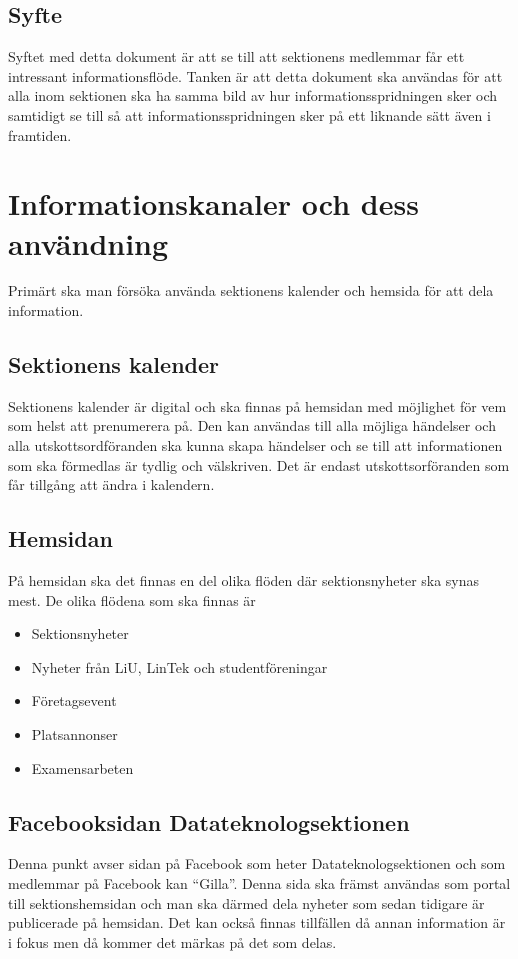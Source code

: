 \documentclass{datateknologsektionen-document}
\begin{document}
\subsection{Syfte}
Syftet med detta dokument är att se till att sektionens medlemmar får ett intressant
informationsflöde. Tanken är att detta dokument ska användas för att alla inom sektionen ska
ha samma bild av hur informationsspridningen sker och samtidigt se till så att
informationsspridningen sker på ett liknande sätt även i framtiden.
\section{Informationskanaler och dess användning}
Primärt ska man försöka använda sektionens kalender och hemsida för att dela information.
\subsection{Sektionens kalender}
Sektionens kalender är digital och ska finnas på hemsidan med möjlighet för vem som helst
att prenumerera på. Den kan användas till alla möjliga händelser och alla utskottsordföranden
ska kunna skapa händelser och se till att informationen som ska förmedlas är tydlig och
välskriven. Det är endast utskottsorföranden som får tillgång att ändra i kalendern.
\subsection{Hemsidan}
På hemsidan ska det finnas en del olika flöden där sektionsnyheter ska synas mest. De olika
flödena som ska finnas är
\begin{itemize}
  \item Sektionsnyheter
  \item Nyheter från LiU, LinTek och studentföreningar
  \item Företagsevent
  \item Platsannonser
  \item Examensarbeten
\end{itemize}

\subsection{Facebooksidan Datateknologsektionen}
Denna punkt avser sidan på Facebook som heter Datateknologsektionen och som medlemmar
på Facebook kan “Gilla”. Denna sida ska främst användas som portal till sektionshemsidan
och man ska därmed dela nyheter som sedan tidigare är publicerade på hemsidan. Det kan
också finnas tillfällen då annan information är i fokus men då kommer det märkas på det som
delas.
\end{document}
